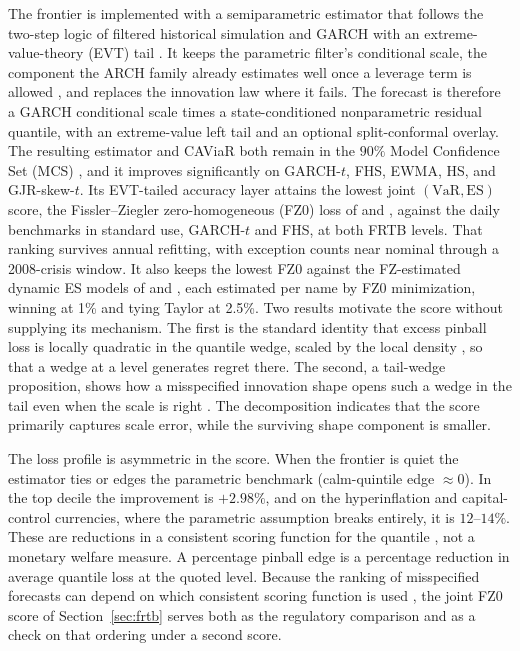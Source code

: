 \documentclass[11pt]{article}
\newcommand{\VaR}{\mathrm{VaR}}
\newcommand{\ES}{\mathrm{ES}}
\theoremstyle{remark}
\begin{document}
The frontier is implemented with a semiparametric estimator that follows the two-step logic of filtered historical simulation and GARCH with an extreme-value-theory (EVT) tail \citep{baroneadesi1999fhs, mcneilfrey2000}. It keeps the parametric filter's conditional scale, the component the ARCH family already estimates well once a leverage term is allowed \citep{hansenlunde2005}, and replaces the innovation law where it fails. The forecast is therefore a GARCH conditional scale times a state-conditioned nonparametric residual quantile, with an extreme-value left tail and an optional split-conformal overlay. The resulting estimator and CAViaR \citep{engle2004caviar} both remain in the $90\%$ Model Confidence Set (MCS) \citep{hansen2011mcs}, and it improves significantly on GARCH-$t$, FHS, EWMA, HS, and GJR-skew-$t$. Its EVT-tailed accuracy layer attains the lowest joint $(\VaR,\ES)$ score, the Fissler--Ziegler zero-homogeneous (FZ0) loss of \citet{fissler2016} and \citet{patton2019}, against the daily benchmarks in standard use, GARCH-$t$ and FHS, at both FRTB levels. That ranking survives annual refitting, with exception counts near nominal through a 2008-crisis window. It also keeps the lowest FZ0 against the FZ-estimated dynamic ES models of \citet{patton2019} and \citet{taylor2019}, each estimated per name by FZ0 minimization, winning at 1\% and tying Taylor at 2.5\%. Two results motivate the score without supplying its mechanism. The first is the standard identity that excess pinball loss is locally quadratic in the quantile wedge, scaled by the local density \citep{gneiting2011, ehm2016, steinwart2011}, so that a wedge at a level generates regret there. The second, a tail-wedge proposition, shows how a misspecified innovation shape opens such a wedge in the tail even when the scale is right \citep{mcneilfrey2000, francqzakoian2015}. The decomposition indicates that the score primarily captures scale error, while the surviving shape component is smaller.

The loss profile is asymmetric in the score. When the frontier is quiet the estimator ties or edges the parametric benchmark (calm-quintile edge $\approx 0$). In the top decile the improvement is $+2.98\%$, and on the hyperinflation and capital-control currencies, where the parametric assumption breaks entirely, it is $12$--$14\%$. These are reductions in a
consistent scoring function for the quantile \citep{gneiting2011}, not
a monetary welfare measure. A percentage pinball edge is a percentage
reduction in average quantile loss at the quoted level. Because the
ranking of misspecified forecasts can depend on which consistent
scoring function is used \citep{patton2020}, the joint FZ0 score of
Section~\ref{sec:frtb} serves both as the regulatory comparison and as
a check on that ordering under a second score.
\end{document}
